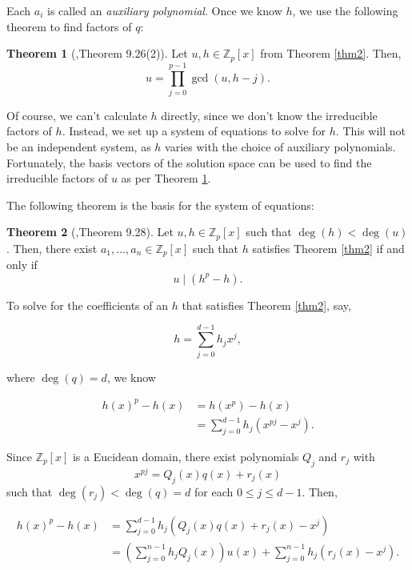 \documentclass{article}
\theoremstyle{definition}
\newtheorem{thm}{Theorem}[section]
\begin{document}
    Each $a_i$ is called an \emph{auxiliary polynomial}. Once we know $h$, we use the following theorem to find factors of $q$:
    
    \begin{thm}[\cite{casc1},Theorem 9.26(2)] \label{thm3}
        Let $u, h \in \mathbb{Z}_p[x]$ from Theorem \ref{thm2}. Then, \[ u = \prod_{j=0}^{p-1}\gcd(u, h - j).\]
    \end{thm}
    
    Of course, we can't calculate $h$ directly, since we don't know the irreducible factors of $h$. Instead, we set up a system of equations to solve for $h$. This will not be an independent system, as $h$ varies with the choice of auxiliary polynomials. Fortunately, the basis vectors of the solution space can be used to find the irreducible factors of $u$ as per Theorem \ref{thm3}.
    
    
    The following theorem is the basis for the system of equations:
    
    \begin{thm}[\cite{casc1},Theorem 9.28] \label{thm4}
        Let $u, h \in \mathbb{Z}_p[x]$ such that $\deg(h) < \deg(u)$. Then, there exist $a_1, \ldots, a_n \in \mathbb{Z}_p[x]$ such that $h$ satisfies Theorem \ref{thm2} if and only if \[u\mid (h^p-h).\]
    \end{thm}
    
    To solve for the coefficients of an $h$ that satisfies Theorem \ref{thm2}, say,
    
    \[h = \sum_{j=0}^{d-1}h_jx^j,\]
    
    where $\deg(q) = d$, we know
    
    \begin{align*}
        h(x)^p-h(x) &= h(x^p)-h(x) \\
                    &= \sum_{j=0}^{d-1}h_j(x^{pj} -x^j).
    \end{align*}
    
    Since $\mathbb{Z}_p[x]$ is a Eucidean domain, there exist polynomials $Q_j$ and $r_j$ with \[ x^{pj} = Q_j(x)q(x)+r_j(x)\] such that $\deg(r_j) < \deg(q) = d$ for each $0 \leq j \leq d - 1$. Then,
    
    \begin{align*}
        h(x)^p-h(x)  &= \sum_{j=0}^{d-1}h_j(Q_j(x)q(x)+r_j(x) -x^j) \\
        &= \left(\sum_{j=0}^{n-1}h_jQ_j(x)\right)u(x) + \sum_{j=0}^{n-1}h_j(r_j(x) - x^j).
    \end{align*}
    
\end{document}
